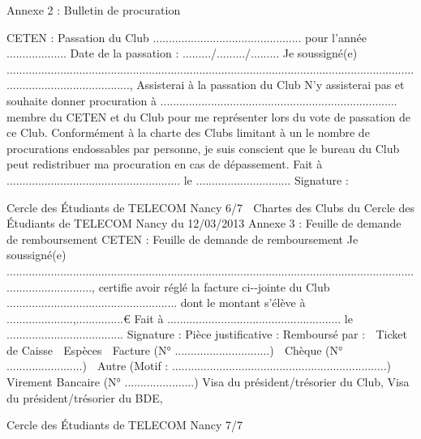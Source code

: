 \documentclass{article} %
\begin{document}
\begin{multicols}{2}
  
Annexe  2  :  Bulletin  de  procuration     
  
CETEN  :  Passation  du  Club  ...............................................  pour  l’année  ...................  
Date  de  la  passation  :  ........./........./.........  
Je  soussigné(e)  ........................................................................................................................................................................,  
  Assisterai  à  la  passation  du  Club  
  N’y   assisterai   pas   et   souhaite   donner   procuration   à   ...........................................................................    
membre  du  CETEN  et  du  Club  pour  me  représenter  lors  du  vote  de  passation  de  ce  Club.  Conformément  à  la  
charte  des  Clubs  limitant  à  un  le  nombre  de  procurations  endossables  par  personne,  je  suis  conscient  que  le  
bureau  du  Club  peut  redistribuer  ma  procuration  en  cas  de  dépassement.  
Fait  à  .......................................................  le  ..............................            Signature  :  
  
     
                  Cercle  des  Étudiants  de  TELECOM  Nancy   6/7  

Chartes  des  Clubs  du  Cercle  des  Étudiants  de  TELECOM  Nancy  du  12/03/2013  
Annexe  3  :  Feuille  de  demande  de  remboursement     
CETEN  :  Feuille  de  demande  de  remboursement  
Je  soussigné(e)  ............................................................................................................................................................,  certifie  avoir  
réglé  la  facture  ci-­‐jointe  du  Club  ......................................................  dont  le  montant  s’élève  à  .....................,...............€  
Fait  à  .......................................................  le  .....................................            Signature  :  
Pièce  justificative  :   Remboursé  par  :  
☐  Ticket  de  Caisse   ☐  Espèces  
☐  Facture  (N°  ..............................)   ☐  Chèque  (N°  ........................)  
☐  Autre  (Motif  :  ....................................................................)   ☐  Virement  Bancaire  (N°  ......................)  
Visa  du  président/trésorier  du  Club,   Visa  du  président/trésorier  du  BDE,  
  
  
  
                  Cercle  des  Étudiants  de  TELECOM  Nancy   7/7  
	\end{multicols}
\end{document}
